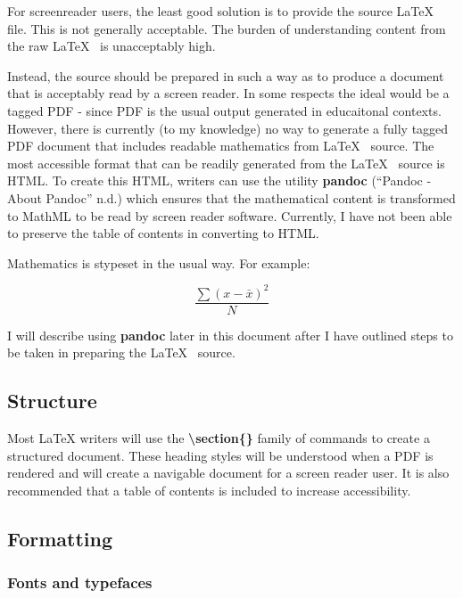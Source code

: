 \documentclass[]{article}
\begin{document}
For screenreader users, the least good solution is to provide the source
\LaTeX~ file. This is not generally acceptable. The burden of
understanding content from the raw \LaTeX~ is unacceptably high.

Instead, the source should be prepared in such a way as to produce a
document that is acceptably read by a screen reader. In some respects
the ideal would be a tagged PDF - since PDF is the usual output
generated in educaitonal contexts. However, there is currently (to my
knowledge) no way to generate a fully tagged PDF document that includes
readable mathematics from \LaTeX~ source. The most accessible format
that can be readily generated from the \LaTeX~ source is HTML.  To create this HTML, 
writers can use the utility \textbf{pandoc} (``Pandoc - About
Pandoc'' n.d.) which ensures that the mathematical content is
transformed to MathML to be read by screen reader software. Currently, I
have not been able to preserve the table of contents in converting to
HTML.

Mathematics is stypeset in the usual way. For example:

\[\frac{\sum{(x-\bar{x})^2}}{N}\]

I will describe using \textbf{pandoc} later in this document after I
have outlined steps to be taken in preparing the \LaTeX~ source.

\hypertarget{structure}{%
\subsection{Structure}\label{structure}}

Most LaTeX writers will use the \textbf{\textbackslash{}section\{\}}
family of commands to create a structured document. These heading styles
will be understood when a PDF is rendered and will create a navigable
document for a screen reader user. It is also recommended that a table
of contents is included to increase accessibility.

\hypertarget{formatting}{%
\subsection{Formatting}\label{formatting}}

\hypertarget{fonts-and-typefaces}{%
\subsubsection{Fonts and typefaces}\label{fonts-and-typefaces}}
\end{document}
